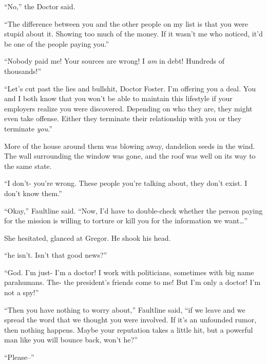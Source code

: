 ``No,'' the Doctor said.



``The difference between you and the other people on my list is that you were stupid about it.  Showing too much of the money.  If it wasn't me who noticed, it'd be one of the people paying you.''



``Nobody paid me!  Your sources are wrong!  I \emph{am} in debt!  Hundreds of thousands!''



``Let's cut past the lies and bullshit, Doctor Foster.  I'm offering you a deal.  You and I both know that you won't be able to maintain this lifestyle if your employers realize you were discovered.  Depending on who they are, they might even take offense.  Either they terminate their relationship with you or they terminate \emph{you}.''



More of the house around them was blowing away, dandelion seeds in the wind.  The wall surrounding the window was gone, and the roof was well on its way to the same state.



``I don't- you're wrong.  These people you're talking about, they don't exist.  I don't know them.''



``Okay,'' Faultline said.  ``Now, I'd have to double-check whether the person paying for the mission is willing to torture or kill you for the information we want\ldots''



She hesitated, glanced at Gregor.  He shook his head.



``\ldotsAnd he isn't.  Isn't that good news?''



``God.  I'm just- I'm a doctor!  I work with politicians, sometimes with big name parahumans.  The- the president's friends come to me!  But I'm only a doctor!  I'm not a spy!''



``Then you have nothing to worry about,'' Faultline said, ``if we leave and we spread the word that we thought you were involved.  If it's an unfounded rumor, then nothing happens.  Maybe your reputation takes a little hit, but a powerful man like you will bounce back, won't he?''



``Please--''



